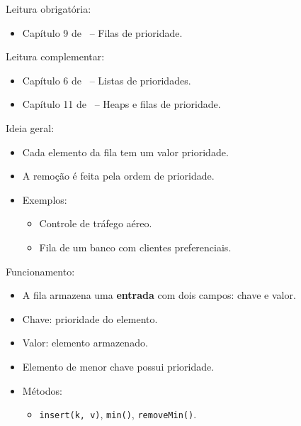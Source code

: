 \newcommand{\defs}{../defs}


\newcommand{\content}{Filas de prioridade}
\newcommand{\class}{Algoritmos e Estruturas de Dados}
\newcommand{\shortcourse}{45EST}



\makeheader

{
Leitura obrigatória:
\begin{itemize}
	\item Capítulo 9 de~\cite{GoodrichEtAl2014} -- Filas de prioridade.
\end{itemize}

Leitura complementar:
\begin{itemize}
	\item Capítulo 6 de~\cite{SzwarcfiterAndMarkenzon1994} -- Listas de prioridades.
	\item Capítulo 11 de~\cite{Preiss2001} -- Heaps e filas de prioridade.
\end{itemize}
}

\medskip


Ideia geral:
\begin{itemize}
	\item Cada elemento da fila tem um valor prioridade.
	\item A remoção é feita pela ordem de prioridade.
	\item Exemplos:
	\begin{itemize}
		\item Controle de tráfego aéreo.
		\item Fila de um banco com clientes preferenciais.
	\end{itemize}
\end{itemize}

\medskip

Funcionamento:
\begin{itemize}
	\item A fila armazena uma \textbf{entrada} com dois campos: chave e valor.
	\item Chave: prioridade do elemento.
	\item Valor: elemento armazenado.
	\item Elemento de menor chave possui prioridade.
	\item Métodos:
	\begin{itemize}
		\item \texttt{insert(k,\,v)}, \texttt{min()}, \texttt{removeMin()}.
	\end{itemize}
\end{itemize}

